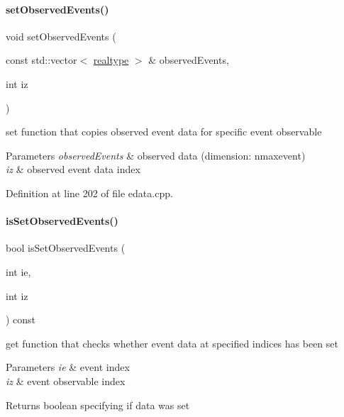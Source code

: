 \paragraph{\texorpdfstring{setObservedEvents()}{setObservedEvents()}\hspace{0.1cm}{\footnotesize\ttfamily [2/2]}}
{\footnotesize\ttfamily void set\+Observed\+Events (\begin{DoxyParamCaption}\item[{const std\+::vector$<$ \mbox{\hyperlink{namespaceamici_a1bdce28051d6a53868f7ccbf5f2c14a3}{realtype}} $>$ \&}]{observed\+Events,  }\item[{int}]{iz }\end{DoxyParamCaption})}

set function that copies observed event data for specific event observable


\begin{DoxyParams}{Parameters}
{\em observed\+Events} & observed data (dimension\+: nmaxevent) \\
\hline
{\em iz} & observed event data index \\
\hline
\end{DoxyParams}


Definition at line 202 of file edata.\+cpp.

\mbox{\label{classamici_1_1_exp_data_a7270ea1362212e4dc344e24dc01b70ee}} 
\paragraph{\texorpdfstring{isSetObservedEvents()}{isSetObservedEvents()}}
{\footnotesize\ttfamily bool is\+Set\+Observed\+Events (\begin{DoxyParamCaption}\item[{int}]{ie,  }\item[{int}]{iz }\end{DoxyParamCaption}) const}

get function that checks whether event data at specified indices has been set


\begin{DoxyParams}{Parameters}
{\em ie} & event index \\
\hline
{\em iz} & event observable index \\
\hline
\end{DoxyParams}
\begin{DoxyReturn}{Returns}
boolean specifying if data was set 
\end{DoxyReturn}


